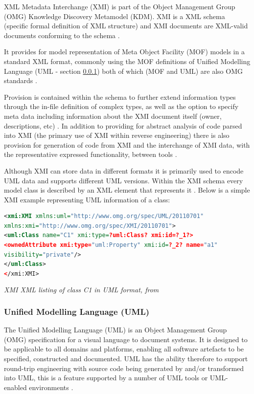 XML Metadata Interchange (XMI) is part of the Object Management Group (OMG) Knowledge Discovery Metamodel (KDM). XMI is a XML schema (specific formal definition of XML structure) and XMI documents are XML-valid documents conforming to the schema \citep{omgxmi}.

It provides for model representation of Meta Object Facility (MOF) models in a standard XML format, commonly using the MOF definitions of Unified Modelling Language (UML - section \ref{lit-reverseengineering-uml}) both of which (MOF and UML) are also OMG standards \citep{omgmof,omgxmi}.

Provision is contained within the schema to further extend information types through the in-file definition of complex types, as well as the option to specify meta data including information about the XMI document itself (owner, descriptions, etc) \citep{omgxmi}. In addition to providing for abstract analysis of code parsed into XMI (the primary use of XMI within reverse engineering) there is also provision for generation of code from XMI and the interchange of XMI data, with the representative expressed functionality, between tools \citep{omgxmi}.

Although XMI can store data in different formats it is primarily used to encode UML data and supports different UML versions. Within the XMI schema every model class is described by an XML element that represents it \citep{omgxmi}. Below is a simple XMI example representing UML information of a class:

\begin{lstlisting}[language=XML]
<xmi:XMI xmlns:uml="http://www.omg.org/spec/UML/20110701"
xmlns:xmi="http://www.omg.org/spec/XMI/20110701">
<uml:Class name="C1" xmi:type=?uml:Class? xmi:id=?_1?>
<ownedAttribute xmi:type="uml:Property" xmi:id=?_2? name="a1"
visibility="private"/>
</uml:Class>
</xmi:XMI>
\end{lstlisting}
\textit{XMI XML listing of class C1 in UML format, from \cite{omgxmi}}

\subsubsection{Unified Modelling Language (UML)}\label{lit-reverseengineering-uml}

The Unified Modelling Language (UML) is an Object Management Group (OMG) specification for a visual language to document systems. It is designed to be applicable to all domains and platforms, enabling all software artefacts to be specified, constructed and documented. UML has the ability therefore to support round-trip engineering with source code being generated by and/or transformed into UML, this is a feature supported by a number of UML tools or UML-enabled environments \citep{omguml}.

